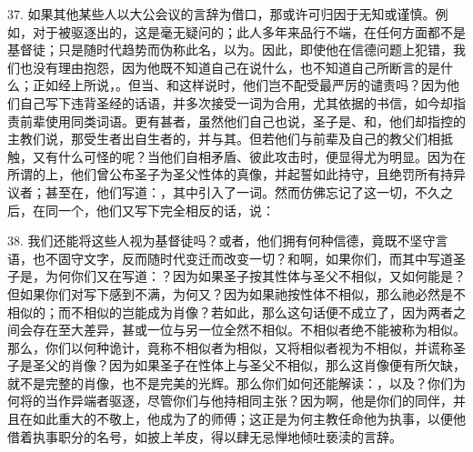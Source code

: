 37. 如果其他某些人以大公会议的言辞为借口，那或许可归因于无知或谨慎。例如，对于被驱逐出的，这是毫无疑问的；此人多年来品行不端，在任何方面都不是基督徒；只是随时代趋势而伪称此名，以为。因此，即使他在信德问题上犯错，我们也没有理由抱怨，因为他既不知道自己在说什么，也不知道自己所断言的是什么；正如经上所说，。但当、和这样说时，他们岂不配受最严厉的谴责吗？因为他们自己写下违背圣经的话语，并多次接受一词为合用，尤其依据的书信，如今却指责前辈使用同类词语。更有甚者，虽然他们自己也说，圣子是、和，他们却指控的主教们说，那受生者出自生者的，并与其。但若他们与前辈及自己的教父们相抵触，又有什么可怪的呢？当他们自相矛盾、彼此攻击时，便显得尤为明显。因为在所谓的上，他们曾公布圣子为圣父性体的真像，并起誓如此持守，且绝罚所有持异议者；甚至在，他们写道：，其中引入了一词。然而仿佛忘记了这一切，不久之后，在同一个，他们又写下完全相反的话，说：\par

38. 我们还能将这些人视为基督徒吗？或者，他们拥有何种信德，竟既不坚守言语，也不固守文字，反而随时代变迁而改变一切？和啊，如果你们，而其中写道圣子是，为何你们又在写道：？因为如果圣子按其性体与圣父不相似，又如何能是？但如果你们对写下感到不满，为何又？因为如果祂按性体不相似，那么祂必然是不相似的；而不相似的岂能成为肖像？若如此，那么这句话便不成立了，因为两者之间会存在至大差异，甚或一位与另一位全然不相似。不相似者绝不能被称为相似。那么，你们以何种诡计，竟称不相似者为相似，又将相似者视为不相似，并谎称圣子是圣父的肖像？因为如果圣子在性体上与圣父不相似，那么这肖像便有所欠缺，就不是完整的肖像，也不是完美的光辉。那么你们如何还能解读：，以及？你们为何将的当作异端者驱逐，尽管你们与他持相同主张？因为啊，他是你们的同伴，并且在如此重大的不敬上，他成为了的师傅；这正是为何主教任命他为执事，以便他借着执事职分的名号，如披上羊皮，得以肆无忌惮地倾吐亵渎的言辞。\par

